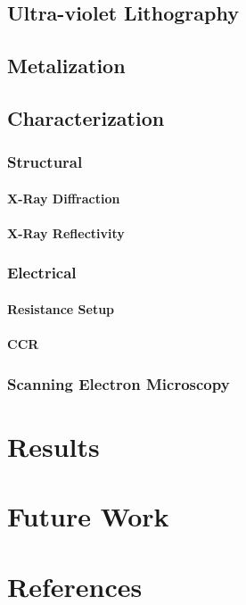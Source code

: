 \documentclass[a4paper,12pt,article,oneside,onecolumn,openany,draft]{memoir}
\begin{document}
\section{Ultra-violet Lithography}
\lipsum[1-2]

\section{Metalization}
\lipsum[1]

\section{Characterization}
\lipsum[1]
\subsection{Structural}
\subsubsection{X-Ray Diffraction}
\lipsum[2]
\subsubsection{X-Ray Reflectivity}
\lipsum[3]
\subsection{Electrical}
\lipsum[4]
\subsubsection{Resistance Setup}
\lipsum[5]
\subsubsection{CCR}
\lipsum[6]
\subsection{Scanning Electron Microscopy}
\lipsum[7]


\newpage
\chapter{Results}
\thispagestyle{simple}
\lipsum[1-5]

\newpage
\chapter{Future Work}
\thispagestyle{simple}
\lipsum[1-5]

\newpage
\chapter*{References}
\end{document}
